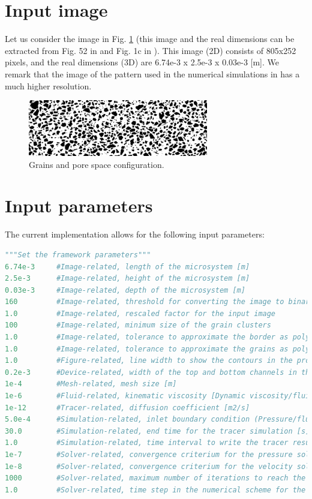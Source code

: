 \documentclass[10pt]{article}
\begin{document}
\section{Input image}

Let us consider the image in Fig. \ref{modelo} (this image and the real dimensions can be extracted from Fig. 52 in \cite{Benali2019} and Fig. 1c in \cite{Liu2022}). This image (2D) consists of 805x252 pixels, and the real dimensions (3D) are 6.74e-3 x 2.5e-3 x 0.03e-3 [m]. We remark that the image of the pattern used in the numerical simulations in \cite{Liu2022} has a much higher resolution.
\begin{figure}[h!]
\centering
\includegraphics[width=0.7\textwidth]{microsystem.png}
\caption{Grains and pore space configuration.}
\label{modelo} 
\end{figure}

\section{Input parameters}
The current implementation allows for the following input parameters:

\begin{lstlisting}[language=Python]
"""Set the framework parameters"""
6.74e-3     #Image-related, length of the microsystem [m]
2.5e-3      #Image-related, height of the microsystem [m]
0.03e-3     #Image-related, depth of the microsystem [m]
160         #Image-related, threshold for converting the image to binary
1.0         #Image-related, rescaled factor for the input image
100         #Image-related, minimum size of the grain clusters
1.0         #Image-related, tolerance to approximate the border as polygon
1.0         #Image-related, tolerance to approximate the grains as polygon
1.0         #Figure-related, line width to show the contours in the produced figures
0.2e-3      #Device-related, width of the top and bottom channels in the micromodel device [m]
1e-4        #Mesh-related, mesh size [m]
1e-6        #Fluid-related, kinematic viscosity [Dynamic viscosity/fluid_density, m2/s]
1e-12       #Tracer-related, diffusion coefficient [m2/s]
5.0e-4      #Simulation-related, inlet boundary condition (Pressure/fluid_density, [Pa/(kg/m3)])
30.0        #Simulation-related, end time for the tracer simulation [s]
1.0         #Simulation-related, time interval to write the tracer results [s]
1e-7        #Solver-related, convergence criterium for the pressure solution
1e-8        #Solver-related, convergence criterium for the velocity solution
1000        #Solver-related, maximum number of iterations to reach the convergence criteria
1.0         #Solver-related, time step in the numerical scheme for the Tracer simulation [s]
\end{lstlisting}
\end{document}

